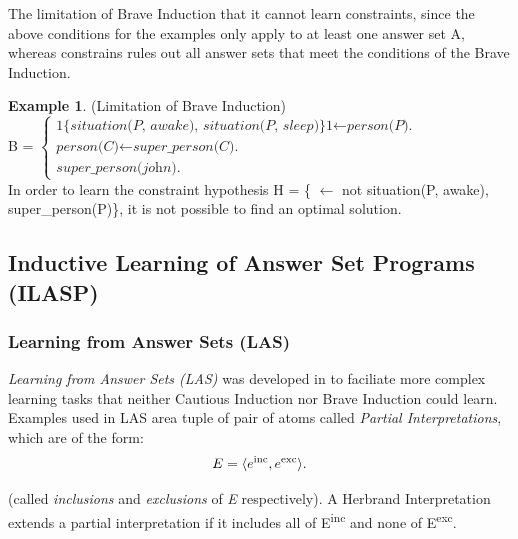 \documentclass[12pt,twoside]{report}
\theoremstyle{plain}
\theoremstyle{definition}
\newtheorem{examp}{Example}[section]
\begin{document}
The limitation of Brave Induction that it cannot learn constraints, since the above conditions for the examples only apply to at least one answer set A, whereas constrains rules out all answer sets that meet  the conditions of the Brave Induction.

\begin{examp} \normalfont (Limitation of Brave Induction) \\

B = $\begin{cases}
	\textit{1\{situation(P, awake), situation(P, sleep)\}1} \leftarrow \textit{person(P).} \\
	\textit{person(C)} \leftarrow \textit{super\_person(C).} \\
	\textit{super\_person(john).}
	\end{cases}$ \\

In order to learn the  constraint hypothesis H = \{ $\leftarrow$ not situation(P, awake), super\_person(P)\}, it is not possible to find an optimal solution.
\end{examp}
\label{limitation_brave}

\subsection{Inductive Learning of Answer Set Programs (ILASP)}
\label{section_lasp}

\subsubsection{Learning from Answer Sets (LAS)}
\textit{Learning from Answer Sets (LAS)} was developed in \cite{Law2014} to faciliate more complex learning tasks that neither Cautious Induction nor Brave Induction could learn.
Examples used in LAS area tuple of pair of atoms called \textit{Partial Interpretations}, which are of the form:
\begin{equation}
\begin{split}
E = \langle e\textsuperscript{inc}, e\textsuperscript{exc} \rangle. 
\end{split}
\label{partial_interpretations}
\end{equation}

(called \textit{inclusions} and \textit{exclusions} of \textit{E} respectively).  A Herbrand Interpretation extends a partial interpretation if it includes all of E\textsuperscript{inc} and none of E\textsuperscript{exc}.
\end{document}

